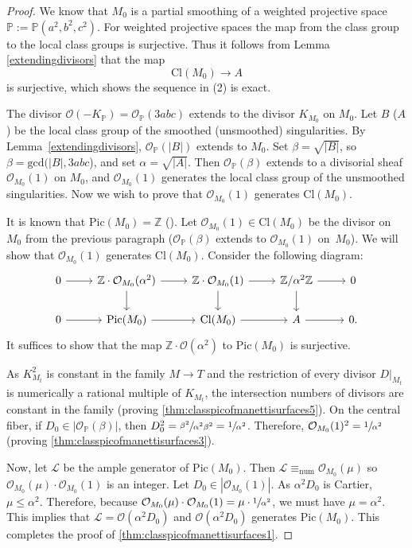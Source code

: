 \documentclass[JEP,XML,SOM,Unicode,NoFloatCountersInSection,published]{cedram}
\theoremstyle{plain}
\theoremstyle{definition}
\newcommand\PP{{\mathbb{P}}}
\newcommand\ZZ{{\mathbb Z}}
\newcommand\Lc{{\mathcal L}}
\newcommand\Oc{{\mathcal O}}
\newcommand\Cl{{\mathrm{Cl}}}
\newcommand\Pic{{\mathrm{Pic}}}
\newcommand\Pabc{{\PP(a^2,b^2,c^2)}}
\begin{document}
\begin{proof}
We know that $M_0$ is a partial smoothing of a weighted projective space $\PP:=\Pabc$. For weighted projective spaces the map from the class group to the local class groups is surjective. Thus it follows from Lemma \ref{extendingdivisors} that the map
\[
\Cl(M_0)\to A
\]
is surjective, which shows the sequence in (2) is exact.

The divisor $\Oc(-K_{\PP})=\Oc_{\PP}(3abc)$ extends to the divisor $K_{M_0}$ on $M_0$. Let $B$ (\resp $A$) be the local class group of the smoothed (\resp unsmoothed) singularities. By Lemma~\ref{extendingdivisors}, $\Oc_\PP(|B|)$ extends to $M_0$. Set $\beta = \sqrt{|B|}$, so $\beta=\mathrm{gcd}(|B|, 3abc$), and set $\alpha=\sqrt{|A|}$. Then $\Oc_\PP(\beta)$ extends to a divisorial sheaf $\Oc_{M_0}(1)$ on $M_0$, and $\Oc_{M_0}(1)$ generates the local class group of the unsmoothed singularities. Now we wish to prove that $\Oc_{M_0}(1)$ generates $\Cl(M_0)$.

It is known that $\Pic(M_0)=\ZZ$ (\cite[Lem.\,2.1, Prop.\,6.3]{Hacking}). Let $\Oc_{M_0}(1)\in \Cl(M_0)$ be the divisor on $M_0$ from the previous paragraph (\ie $\Oc_\PP(\beta)$ extends to $\Oc_{M_0}(1)$ on~$M_0$). We will show that $\Oc_{M_0}(1)$ generates $\Cl(M_0)$. Consider the following diagram:\vspace*{-3pt}
\[
\begin{tikzcd}
0\arrow[r] & \ZZ\cdot \Oc_{M_0}(\alpha^2)\arrow[r] \arrow[d]& \ZZ\cdot \Oc_{M_0}(1)\arrow[r]\arrow[d] & \ZZ/\alpha^2\ZZ\arrow[r]\arrow[d] &0\\
0 \arrow[r] &\Pic(M_0)\arrow[r] & \Cl(M_0)\arrow[r] & A\arrow[r] &0.
\end{tikzcd}
\]
It suffices to show that the map $\ZZ\cdot \Oc(\alpha^2)$ to $\Pic(M_0)$ is surjective.

As $K_{M_t}^2$ is constant in the family $M \to T$ and the restriction of every divisor $D|_{M_t}$ is numerically a rational multiple of $K_{M_t}$, the intersection numbers of divisors are constant in the family (proving \eqref{thm:classpicofmanettisurfaces5}). On the central fiber, if $D_0 \in |\Oc_\PP(\beta)|$, then $D_0^2 = \sfrac{\beta^2}{\alpha^2\beta^2} = \sfrac{1}{\alpha^2}$. Therefore, $\Oc_{M_0}(1)^2 = \sfrac{1}{\alpha^2}$ (proving \eqref{thm:classpicofmanettisurfaces3}).

Now, let $\Lc$ be the ample generator of $\Pic(M_0)$. Then $\Lc \equiv_{\mathrm{num}} \Oc_{M_0}(\mu)$ so $\Oc_{M_0}(\mu)\cdot \Oc_{M_0}(1)$ is an integer. Let $D_0 \in |\Oc_{M_0}(1)|$. As $\alpha^2D_0$ is Cartier, $\mu \le \alpha^2$. Therefore, because $\Oc_{M_0}(\mu)\cdot \Oc_{M_0}(1) = \mu \cdot\sfrac{1}{\alpha^2}$, we must have $\mu = \alpha^2$. This implies that $\Lc = \Oc(\alpha^2 D_0) $ and $\Oc(\alpha^2 D_0)$ generates $\Pic(M_0)$. This completes the proof of \eqref{thm:classpicofmanettisurfaces1}.


\end{proof}
\end{document}
